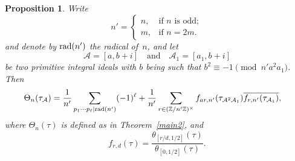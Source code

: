 \documentclass[11pt, reqno]{amsart}
\theoremstyle{plain}
\newtheorem{proposition}[theorem]{Proposition}
\theoremstyle{definition}
\numberwithin{equation}{section}
\begin{document}
\begin{proposition}\label{corthetaf}
      Write 
$$
n'=\begin{cases}
    n,&\mbox{if $n$ is odd};\\
    m,&\mbox{if $n=2m$}.
\end{cases}
$$   
and denote by ${\rm rad}(n')$ the radical of~$n$, and let 
    $$
    \mathcal{A}=[a,b+i]\quad\mbox{and}\quad \mathcal{A}_{1}=[a_{1},b+i]
    $$
    be two primitive integral ideals with $b$ being  such that $b^{2}\equiv-1\pmod{n'a^{2}a_{1}}$. Then
    \begin{align*}
       \Theta_{n}(\tau_{\mathcal{A}})&=\frac{1}{n'}\sum_{p_{1}\cdots p_{\ell}|{\rm rad}(n')}(-1)^{\ell}+\frac{1}{n'}\sum_{r\in(\mathbb{Z}/n'\mathbb{Z})^{\times}}f_{ar,n'}(\tau_{\mathcal{A}^{2}\mathcal{A}_{1}})\overline{f_{r,n'}(\tau_{\mathcal{A}_{1}})},
    \end{align*}
    where $\Theta_{n}(\tau)$ is defined as in Theorem~\ref{main2}, and
    $$
    f_{r,d}(\tau)=\frac{\theta_{[r/d,1/2]}(\tau)}{\theta_{[0,1/2]}(\tau)}.
    $$
\end{proposition}
\end{document}
